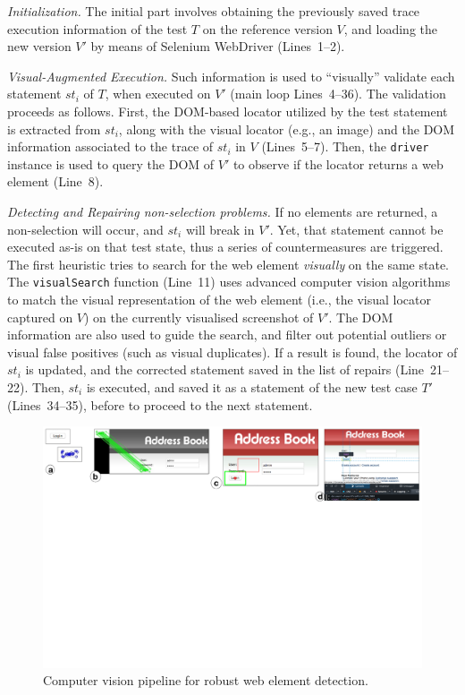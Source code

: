 \textit{Initialization.} 
The initial part involves obtaining the previously saved trace execution information of the test $T$ on the reference version $V$, and loading the new version $V'$ by means of Selenium WebDriver (Lines~1--2). 

\textit{Visual-Augmented Execution.}
Such information is used to ``visually'' validate each statement $st_i$ of $T$, when executed on $V'$ (main loop Lines~4--36). The validation proceeds as follows. First, the DOM-based locator utilized by the test statement is extracted from $st_i$, along with the visual locator (e.g., an image) and the DOM information associated to the trace of $st_i$ in $V$  (Lines~5--7). Then, the \texttt{driver} instance is used to query the DOM of $V'$ to observe if the locator returns a web element (Line~8). 



\textit{Detecting and Repairing non-selection problems.}
If no elements are returned, a non-selection will occur, and $st_i$ will break in $V'$. Yet, that statement cannot be executed as-is on that test state, thus a series of countermeasures are triggered. The first heuristic tries to search for the web element \textit{visually} on the same state. The \texttt{visualSearch} function (Line~11) uses advanced computer vision algorithms to match the visual representation of the web element (i.e., the visual locator captured on $V$) on the currently visualised screenshot of $V'$. The DOM information are also used to guide the search, and filter out potential outliers or visual false positives (such as visual duplicates). If a result is found, the locator of $st_i$ is updated, and the corrected statement saved in the list of repairs (Line~21--22). Then, $st_i$ is executed, and saved it as a statement of the new test case $T'$ (Lines~34--35), before to proceed to the next statement.

\begin{figure}[t]
\centering
\includegraphics[trim={0.3cm 17cm 0.4cm 0.3cm},clip,scale=0.44]{images/cv}
\caption{Computer vision pipeline for robust web element detection.}
\label{fig:cv}
\end{figure}

